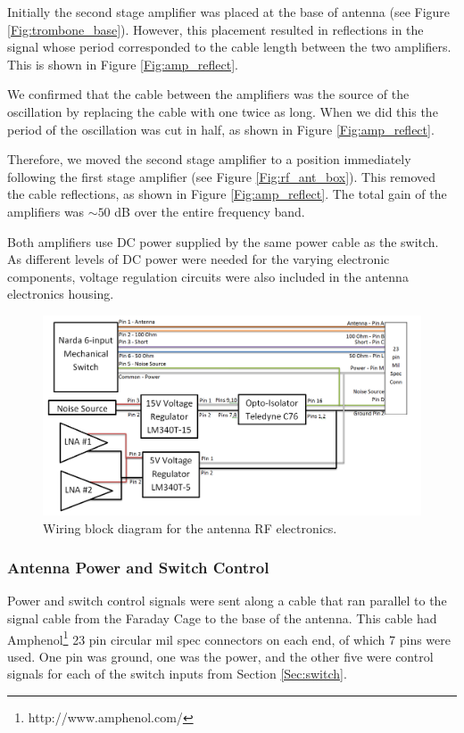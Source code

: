 Initially the second stage amplifier was placed at the base of antenna (see Figure \ref{Fig:trombone_base}). However, this placement resulted in reflections in the signal whose period corresponded to the cable length between the two amplifiers. This is shown in Figure \ref{Fig:amp_reflect}. 

We confirmed that the cable between the amplifiers was the source of the oscillation by replacing the cable with one twice as long. When we did this the period of the oscillation was cut in half, as shown in Figure \ref{Fig:amp_reflect}. 

Therefore, we moved the second stage amplifier to a position immediately following the first stage amplifier (see Figure \ref{Fig:rf_ant_box}). This removed the cable reflections, as shown in Figure \ref{Fig:amp_reflect}. The total gain of the amplifiers was $\sim 50$ dB over the entire frequency band. 

Both amplifiers use DC power supplied by the same power cable as the switch. As different levels of DC power were needed for the varying electronic components, voltage regulation circuits were also included in the antenna electronics housing. 

\begin{figure}[htb]
\begin{center}
\includegraphics[width=0.9\linewidth]{SCIHI_system/figures/antenna_rf_power_block_diagram.png}
\caption{Wiring block diagram for the antenna RF electronics.}
\label{Fig:ant_RF_pow_block_diagram}
\end{center}
\end{figure}

\subsubsection{Antenna Power and Switch Control} \label{Sec:ant_pow}
Power and switch control signals were sent along a cable that ran parallel to the signal cable from the Faraday Cage to the base of the antenna. This cable had Amphenol\footnote{http://www.amphenol.com/} 23 pin circular mil spec connectors on each end, of which 7 pins were used. One pin was ground, one was the power, and the other five were control signals for each of the switch inputs from Section \ref{Sec:switch}. 

